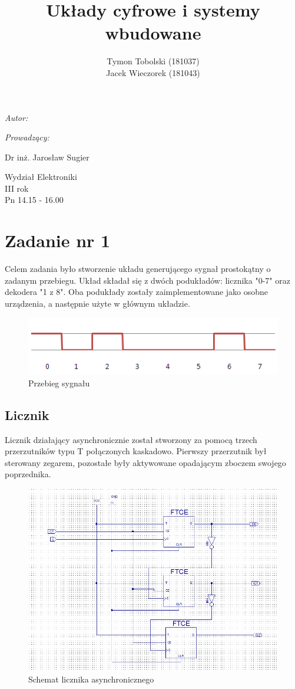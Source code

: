 \documentclass[wide,a4paper,titlepage,12pt] {article}
\title{Układy cyfrowe i systemy wbudowane}
\author{Tymon Tobolski (181037)\\ Jacek Wieczorek (181043)}
\makeatletter
\renewcommand{\maketitle}{
\begin{titlepage}
  \begin{center}
    \vspace*{3cm}
    \LARGE \@title \par
    \vspace{2cm}
    \textit{\small Autor:}\par
    \normalsize \@author\par \normalsize
    \vspace{3cm}
    \textit{\small Prowadzący:}\par
    Dr inż. Jarosław Sugier \par
    \vspace{2cm}
    Wydział Elektroniki\\ III rok\\ Pn 14.15 - 16.00\par
    \vspace{4cm}
    \small \@date
  \end{center}
\end{titlepage}
}
\makeatother
\begin{document}
\maketitle
  \section{Zadanie nr 1}
  Celem zadania było stworzenie układu generującego sygnał prostokątny o zadanym przebiegu.
  Układ składał się z dwóch podukładów: licznika "0-7" oraz dekodera "1 z 8".
  Oba podukłady zostały zaimplementowane jako osobne urządzenia, a następnie użyte w głównym układzie.

  \begin{figure}[htbp]
    \begin{center}
      \includegraphics[scale=0.6]{syg.png}
      \caption{Przebieg sygnału}
     \end{center}
  \end{figure}

  \subsection{Licznik}
  Licznik działający asynchronicznie został stworzony za pomocą trzech przerzutników typu T połączonych kaskadowo. Pierwszy przerzutnik był sterowany zegarem, pozostałe były aktywowane opadającym zboczem swojego poprzednika.

  \begin{figure}[htbp]
    \begin{center}
      \includegraphics[scale=0.6]{licznik_asynch.png}
      \caption{Schemat licznika asynchronicznego}
     \end{center}
  \end{figure}
\end{document}
